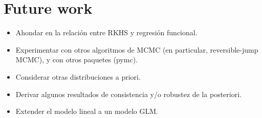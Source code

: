 \section{Future work}

\begin{outcomment}
  \begin{itemize}
    \item Ahondar en la relación entre RKHS y regresión funcional.
    \item Experimentar con otros algoritmos de MCMC (en particular, reversible-jump MCMC), y con otros paquetes (pymc).
    \item Considerar otras distribuciones a priori.
    \item Derivar algunos resultados de consistencia y/o robustez de la posteriori.
    \item Extender el modelo lineal a un modelo GLM.
  \end{itemize}
\end{outcomment}
